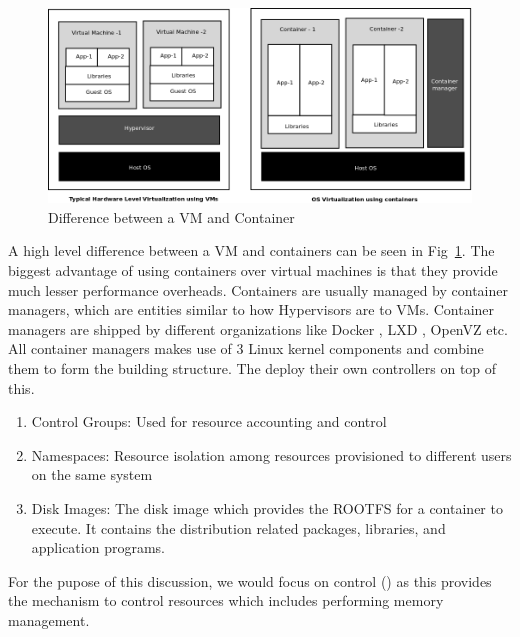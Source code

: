      \begin{figure}
      \centering
      \includegraphics[width=1\textwidth]{images/background/container_vs_vm.png}
      \caption{Difference between a VM and Container}
      \label{img:difference}
    \end{figure}

A high level difference between a VM and containers can be seen in Fig~\ref{img:difference}. The biggest advantage of using containers over 
virtual machines is that they provide much lesser performance overheads. Containers are usually managed by container managers, which are 
entities similar to how Hypervisors are to VMs. Container managers are shipped by different organizations like Docker \cite{docker}, LXD 
\cite{lxd}, OpenVZ \cite{kolyshkin2006virtualization} etc. All container managers makes use of 3 Linux kernel components and combine 
them to form the building structure. The deploy their own controllers on top of this. 
    
    \begin{enumerate}
      \item Control Groups: Used for resource accounting and control
      \item Namespaces: Resource isolation among resources provisioned to different users on the same system
      \item Disk Images: The disk image which provides the ROOTFS for a container to execute. It contains the distribution related 
packages, libraries, and application programs.
    \end{enumerate}
    
    For the pupose of this discussion, we would focus on control \cg{} (\cg{}) as this provides the mechanism to control resources 
which includes performing memory management.

  

